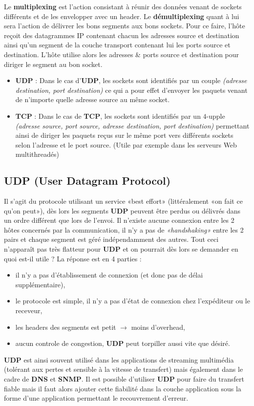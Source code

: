 \documentclass{article}
\begin{document}
Le \textbf{multiplexing} est l'action consistant à réunir des données venant de sockets différents et de les 
envelopper avec un header. Le \textbf{démultiplexing} quant à lui sera l'action de délivrer les bons segments 
aux bons sockets. Pour ce faire, l'hôte reçoit des datagrammes IP contenant chacun les adresses source et 
destination ainsi qu'un segment de la couche transport contenant lui les ports source et destination. L'hôte
utilise alors les adresses \& ports source et destination pour diriger le segment au bon socket.
\begin{itemize}
\item \textbf{UDP} : Dans le cas d'\textbf{UDP}, les sockets sont identifiés par un couple \textit{(adresse 
destination, port destination)} ce qui a pour effet d'envoyer les paquets venant de n'importe quelle adresse 
source au même socket.
\item \textbf{TCP} : Dans le cas de \textbf{TCP}, les sockets sont identifiés par un $4$-upple \textit{(adresse 
source, port source, adresse destination, port destination)} permettant ainsi de diriger les paquets reçus sur 
le même port vers différents sockets selon l'adresse et le port source. (Utile par exemple dans les serveurs Web 
multithreadés)
\end{itemize}

\subsection{UDP (User Datagram Protocol)}

Il s'agit du protocole utilisant un service «best effort» (littéralement «on fait ce qu'on peut»), dès lors les
segments \textbf{UDP} peuvent être perdus ou délivrés dans un ordre différent que lors de l'envoi. Il n'existe 
aucune connexion entre les 2 hôtes concernés par la communication, il n'y a pas de \textit{«handshaking»} entre 
les 2 pairs et chaque segment est géré indépendamment des autres. Tout ceci n'apparaît pas très flatteur pour 
\textbf{UDP} et on pourrait dès lors se demander en quoi est-il utile ? La réponse est en 4 parties : 
\begin{itemize}
\item il n'y a pas d'établissement de connexion (et donc pas de délai supplémentaire),
\item le protocole est simple, il n'y a pas d'état de connexion chez l'expéditeur ou le receveur,
\item les headers des segments est petit $\rightarrow$ moins d'overhead,
\item aucun controle de congestion, \textbf{UDP} peut torpiller aussi vite que désiré.
\end{itemize}
\textbf{UDP} est ainsi souvent utilisé dans les applications de streaming multimédia (tolérant aux pertes et 
sensible à la vitesse de transfert) mais également dans le cadre de \textbf{DNS} et \textbf{SNMP}. Il est 
possible d'utiliser \textbf{UDP} pour faire du transfert fiable mais il faut alors ajouter cette fiabilité dans
la couche application sous la forme d'une application permettant le recouvrement d'erreur.
\end{document}
